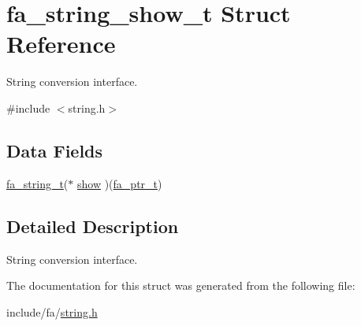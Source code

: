 \hypertarget{structfa__string__show__t}{\section{fa\-\_\-string\-\_\-show\-\_\-t Struct Reference}
\label{structfa__string__show__t}
}


String conversion interface.  




{\ttfamily \#include $<$string.\-h$>$}

\subsection*{Data Fields}
\begin{DoxyCompactItemize}
\item 
\hyperlink{group___fa_string_gacada63033b77bc6c39fa632ae199349b}{fa\-\_\-string\-\_\-t}($\ast$ \hyperlink{group___fa_gaa9bc7104528922c7e4308f316212dc39}{show} )(\hyperlink{group___fa_ga915ddeae99ad7568b273d2b876425197}{fa\-\_\-ptr\-\_\-t})
\end{DoxyCompactItemize}


\subsection{Detailed Description}
String conversion interface. 

The documentation for this struct was generated from the following file\-:\begin{DoxyCompactItemize}
\item 
include/fa/\hyperlink{string_8h}{string.\-h}\end{DoxyCompactItemize}
